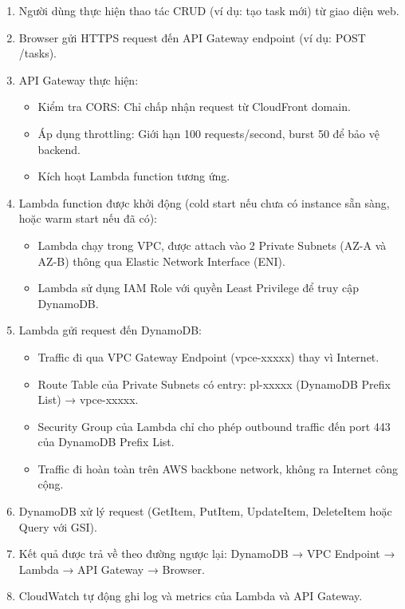 \begin{enumerate}
    \item Người dùng thực hiện thao tác CRUD (ví dụ: tạo task mới) từ giao diện web.
    \item Browser gửi HTTPS request đến API Gateway endpoint (ví dụ: POST /tasks).
    \item API Gateway thực hiện:
    \begin{itemize}
        \item Kiểm tra CORS: Chỉ chấp nhận request từ CloudFront domain.
        \item Áp dụng throttling: Giới hạn 100 requests/second, burst 50 để bảo vệ backend.
        \item Kích hoạt Lambda function tương ứng.
    \end{itemize}
    \item Lambda function được khởi động (cold start nếu chưa có instance sẵn sàng, hoặc warm start nếu đã có):
    \begin{itemize}
        \item Lambda chạy trong VPC, được attach vào 2 Private Subnets (AZ-A và AZ-B) thông qua Elastic Network Interface (ENI).
        \item Lambda sử dụng IAM Role với quyền Least Privilege để truy cập DynamoDB.
    \end{itemize}
    \item Lambda gửi request đến DynamoDB:
    \begin{itemize}
        \item Traffic đi qua VPC Gateway Endpoint (vpce-xxxxx) thay vì Internet.
        \item Route Table của Private Subnets có entry: pl-xxxxx (DynamoDB Prefix List) → vpce-xxxxx.
        \item Security Group của Lambda chỉ cho phép outbound traffic đến port 443 của DynamoDB Prefix List.
        \item Traffic đi hoàn toàn trên AWS backbone network, không ra Internet công cộng.
    \end{itemize}
    \item DynamoDB xử lý request (GetItem, PutItem, UpdateItem, DeleteItem hoặc Query với GSI).
    \item Kết quả được trả về theo đường ngược lại: DynamoDB → VPC Endpoint → Lambda → API Gateway → Browser.
    \item CloudWatch tự động ghi log và metrics của Lambda và API Gateway.
\end{enumerate}

